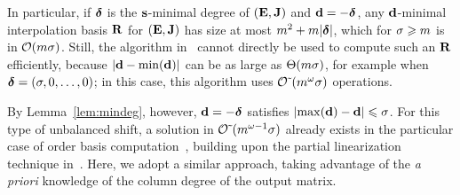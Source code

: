 \documentclass[preprint]{sig-alternate-05-2015}
\begin{document}
In particular, if $\minDegs$ is the $\shifts$-minimal degree of
$(\evMat,\mulmat)$ and $\shifts[d] = -\minDegs$, any $\shifts[d]$-minimal
interpolation basis $\mat{R}$ for $(\evMat,\mulmat)$ has size at most $\rdim^2
+ \rdim \sumVec{\minDegs}$, which for $\order \ge \rdim$ is in $\bigO{\rdim
\order}$. Still, the algorithm in~\cite{JeNeScVi15} cannot directly be used to
compute such an $\mat{R}$ efficiently, because $\sshifts[{\shifts[d] -
\min(\shifts[d])}]$ can be as large as $\Theta(\rdim \order)$, for example when
$\minDegs = (\order,0,\ldots,0)$; in this case, this algorithm uses
$\softO{\rdim^\expmatmul \order}$ operations.

By Lemma~\ref{lem:mindeg}, however, $\shifts[d] = -\minDegs$ satisfies
$\sshifts[{\!\max(\shifts[d]) - \shifts[d]}] \le \order$. For this type of
unbalanced shift, a solution in $\softO{\rdim^{\expmatmul-1} \order}$ already
exists in the particular case of order basis
computation~\cite[Section~6]{ZhoLab12}, building upon the partial linearization
technique in~\cite[Section~3]{Storjohann06}. Here, we adopt a similar approach,
taking advantage of the \emph{a priori} knowledge of the column degree of the
output matrix.
\end{document}
